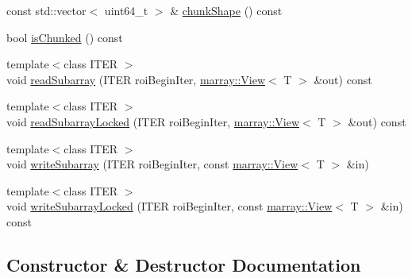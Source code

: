 \begin{DoxyCompactItemize}
const std\+::vector$<$ uint64\+\_\+t $>$ \& \hyperlink{classnifty_1_1hdf5_1_1Hdf5Array_a8b03c8d2a52a0d0612ded1626d0eacc0}{chunk\+Shape} () const
\item 
bool \hyperlink{classnifty_1_1hdf5_1_1Hdf5Array_a4ae66ef4e9ba86c5f311c6476fb1b422}{is\+Chunked} () const
\item 
{\footnotesize template$<$class I\+T\+ER $>$ }\\void \hyperlink{classnifty_1_1hdf5_1_1Hdf5Array_a25f997d6ad4bc0399afa4e2605f229f2}{read\+Subarray} (I\+T\+ER roi\+Begin\+Iter, \hyperlink{classandres_1_1View}{marray\+::\+View}$<$ T $>$ \&out) const
\item 
{\footnotesize template$<$class I\+T\+ER $>$ }\\void \hyperlink{classnifty_1_1hdf5_1_1Hdf5Array_a28ca00a795e9cc8e9be100b1955b7d93}{read\+Subarray\+Locked} (I\+T\+ER roi\+Begin\+Iter, \hyperlink{classandres_1_1View}{marray\+::\+View}$<$ T $>$ \&out) const
\item 
{\footnotesize template$<$class I\+T\+ER $>$ }\\void \hyperlink{classnifty_1_1hdf5_1_1Hdf5Array_af6773c766d8f098f715e74de486df0af}{write\+Subarray} (I\+T\+ER roi\+Begin\+Iter, const \hyperlink{classandres_1_1View}{marray\+::\+View}$<$ T $>$ \&in)
\item 
{\footnotesize template$<$class I\+T\+ER $>$ }\\void \hyperlink{classnifty_1_1hdf5_1_1Hdf5Array_a858b48f56fcc9d439d0d86fd2846f05d}{write\+Subarray\+Locked} (I\+T\+ER roi\+Begin\+Iter, const \hyperlink{classandres_1_1View}{marray\+::\+View}$<$ T $>$ \&in) const
\end{DoxyCompactItemize}


\subsection{Constructor \& Destructor Documentation}
\mbox{\label{classnifty_1_1hdf5_1_1Hdf5Array_af164b10a52ab55e3f5a72004b6f6e278}} 
